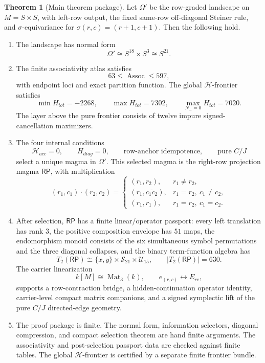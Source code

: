 \documentclass[11pt]{article}
\theoremstyle{definition}
\newtheorem{theorem}{Theorem}[section]
\newcommand{\RP}{\mathsf{RP}}
\begin{document}
\begin{theorem}[Main theorem package]\label{thm:main}
Let \(\Omega'\) be the row-graded landscape on \(M=S\times S\), with
left-row output, the fixed same-row off-diagonal Steiner rule, and
\(\sigma\)-equivariance for \(\sigma(r,c)=(r+1,c+1)\).  Then the following
hold.

\begin{enumerate}[label=\textup{(\roman*)}]
\item The landscape has normal form
\[
\Omega'\cong S^{18}\times S^3\cong S^{21}.
\]

\item The finite associativity atlas satisfies
\[
63\le \operatorname{Assoc}\le 597,
\]
with endpoint loci and exact partition function.  The global
\(\mathcal H\)-frontier satisfies
\[
\min H_{tot}=-2268,
\qquad
\max H_{tot}=7302,
\qquad
\max_{N_-=0}H_{tot}=7020.
\]
The layer above the pure frontier consists of twelve impure
signed-cancellation maximizers.

\item The four internal conditions
\[
\mathcal H_{acc}=0,
\qquad
H_{diag}=0,
\qquad
\text{row-anchor idempotence},
\qquad
\text{pure }C/J
\]
select a unique magma in \(\Omega'\).  This selected magma is the
right-row projection magma \(\RP\), with multiplication
\[
(r_1,c_1)\cdot(r_2,c_2)=
\begin{cases}
(r_1,r_2), & r_1\ne r_2,\\[1mm]
(r_1,\overline{c_1c_2}), & r_1=r_2,\ c_1\ne c_2,\\[1mm]
(r_1,r_1), & r_1=r_2,\ c_1=c_2.
\end{cases}
\]

\item After selection, \(\RP\) has a finite linear/operator passport:
every left translation has rank \(3\), the positive composition envelope
has \(51\) maps, the endomorphism monoid consists of the six simultaneous
symbol permutations and the three diagonal collapses, and the binary
term-function algebra has
\[
T_2(\RP)\cong \{x,y\}\times\mathcal S_{21}\times\mathcal U_{15},
\qquad |T_2(\RP)|=630.
\]
The carrier linearization
\[
k[M]\cong \operatorname{Mat}_3(k),
\qquad e_{(r,c)}\leftrightarrow E_{rc},
\]
supports a row-contraction bridge, a hidden-continuation operator identity,
carrier-level compact matrix companions, and a signed symplectic lift of the
pure \(C/J\) directed-edge geometry.

\item The proof package is finite.  The normal form, information selectors,
diagonal compression, and compact selection theorem are hand finite
arguments.  The associativity and post-selection passport data are checked
against finite tables.  The global \(\mathcal H\)-frontier is certified
by a separate finite frontier bundle.
\end{enumerate}
\end{theorem}
\end{document}

